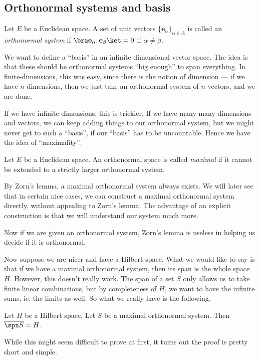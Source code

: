 \documentclass[a4paper]{article}
\begin{document}
\subsection{Orthonormal systems and basis}
\begin{defi}
  Let $E$ be a Euclidean space. A set of unit vectors $\{\mathbf{e}_\alpha\}_{\alpha \in A}$ is called an \emph{orthonormal system} if $\bra \mathbf{e}_\alpha, \mathbf{e}_\beta\ket = 0$ if $\alpha \not= \beta$.
\end{defi}

We want to define a ``basis'' in an infinite dimensional vector space. The idea is that these should be orthonormal systems ``big enough'' to span everything. In finite-dimensions, this was easy, since there is the notion of dimension --- if we have $n$ dimensions, then we just take an orthonormal system of $n$ vectors, and we are done.

If we have infinite dimensions, this is trickier. If we have many many dimensions and vectors, we can keep adding things to our orthonormal system, but we might never get to such a ``basis'', if our ``basis'' has to be uncountable. Hence we have the idea of ``maximality''.

\begin{defi}
  Let $E$ be a Euclidean space. An orthonormal space is called \emph{maximal} if it cannot be extended to a strictly larger orthonormal system.
\end{defi}
By Zorn's lemma, a maximal orthonormal system always exists. We will later see that in certain nice cases, we can construct a maximal orthonormal system directly, without appealing to Zorn's lemma. The advantage of an explicit construction is that we will understand our system much more.

Now if we are given an orthonormal system, Zorn's lemma is useless in helping us decide if it is orthonormal.

Now suppose we are nicer and have a Hilbert space. What we would like to say is that if we have a maximal orthonormal system, then its span is the whole space $H$. However, this doesn't really work. The span of a set $S$ only allows us to take finite linear combinations, but by completeness of $H$, we want to have the infinite sums, ie. the limits as well. So what we really have is the following.

\begin{prop}
  Let $H$ be a Hilbert space. Let $S$ be a maximal orthonormal system. Then $\overline{\spn S} = H$.
\end{prop}
While this might seem difficult to prove at first, it turns out the proof is pretty short and simple.
\end{document}
